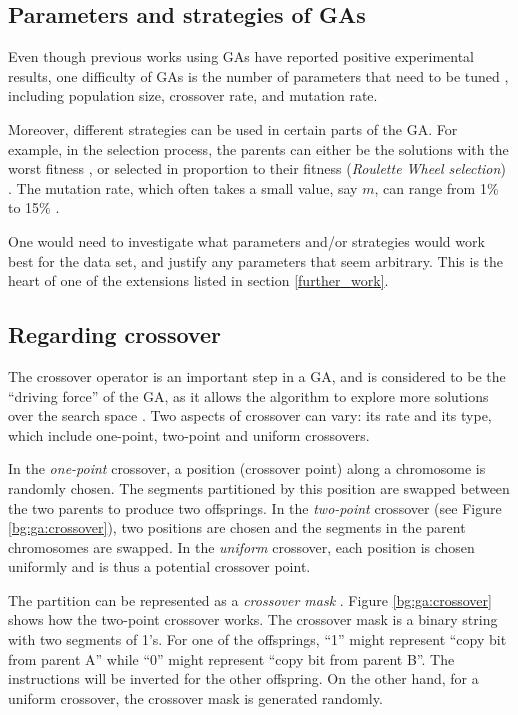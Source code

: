 \documentclass[12pt, twoside, a4paper]{report}
\begin{document}
\subsection{Parameters and strategies of GAs}
Even though previous works using GAs have reported positive experimental results, one difficulty of GAs is the number of parameters that need to be tuned \cite{RefWorks:210}, including population size, crossover rate, and mutation rate.

Moreover, different strategies can be used in certain parts of the GA. For example, in the selection process, the parents can either be the solutions with the worst fitness \cite{RefWorks:203}, or selected in proportion to their fitness (\textit{Roulette Wheel selection}) \cite{RefWorks:205, RefWorks:227}. The mutation rate, which often takes a small value, say $m$, can range from  1\% to 15\% \cite{RefWorks:206}.


One would need to investigate what parameters and/or strategies would work best for the data set, and justify any parameters that seem arbitrary. This is the heart of one of the extensions listed in section \ref{further_work}.

\subsection{Regarding crossover} \label{bg:ga:crossover_sect}
The crossover operator is an important step in a GA, and is considered to be the ``driving force'' of the GA, as it allows the algorithm to explore more solutions over the search space \cite{RefWorks:223, RefWorks:226}. Two aspects of crossover can vary: its rate and its type, which include one-point, two-point and uniform crossovers.

In the \textit{one-point} crossover, a position (crossover point) along a chromosome is randomly chosen. The segments partitioned by this position are swapped between the two parents to produce two offsprings. In the \textit{two-point} crossover (see Figure \ref{bg:ga:crossover}), two positions are chosen and the segments in the parent chromosomes are swapped. In the \textit{uniform} crossover, each position is chosen uniformly and is thus a potential crossover point.

The partition can be represented as a \textit{crossover mask} \cite{RefWorks:205}. Figure \ref{bg:ga:crossover} shows how the two-point crossover works. The crossover mask is a binary string with two segments of 1's. For one of the offsprings, ``1'' might represent ``copy bit from parent A'' while ``0'' might represent ``copy bit from parent B''. The instructions will be inverted for the other offspring. On the other hand, for a uniform crossover, the crossover mask is generated randomly.
\end{document}
